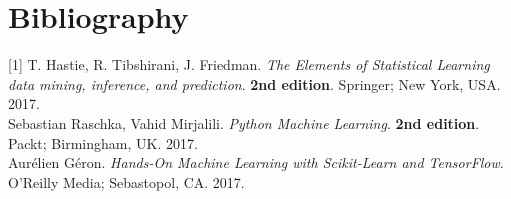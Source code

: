 \section{Bibliography}
\label{chap:Bibliography}

\label{Bib:TheElementsOfStatisticalLearningDataMining}{[1]} T. Hastie, R. Tibshirani, J. Friedman. \textit{The Elements of Statistical Learning data mining, inference, and prediction}. \textbf{2nd edition}. Springer; New York, USA. 2017.\\

\label{Bib:PythonMachineLearning}\noindent [2] Sebastian Raschka, Vahid Mirjalili. \textit{Python Machine Learning}. \textbf{2nd edition}. Packt; Birmingham, UK. 2017.\\

\label{Bib:PythonMachineLearning}\noindent [3] Aurélien Géron. \textit{Hands-On Machine Learning with Scikit-Learn and TensorFlow}. O'Reilly Media; Sebastopol, CA. 2017.\\
